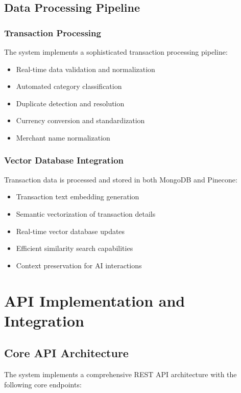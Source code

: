 \documentclass[conference]{IEEEtran}
\begin{document}
\subsection{Data Processing Pipeline}
\subsubsection{Transaction Processing}
The system implements a sophisticated transaction processing pipeline:
\begin{itemize}
\item Real-time data validation and normalization
\item Automated category classification
\item Duplicate detection and resolution
\item Currency conversion and standardization
\item Merchant name normalization
\end{itemize}

\subsubsection{Vector Database Integration}
Transaction data is processed and stored in both MongoDB and Pinecone:
\begin{itemize}
\item Transaction text embedding generation
\item Semantic vectorization of transaction details
\item Real-time vector database updates
\item Efficient similarity search capabilities
\item Context preservation for AI interactions
\end{itemize}

\section{API Implementation and Integration}
\subsection{Core API Architecture}
The system implements a comprehensive REST API architecture with the following core endpoints:
\end{document}
